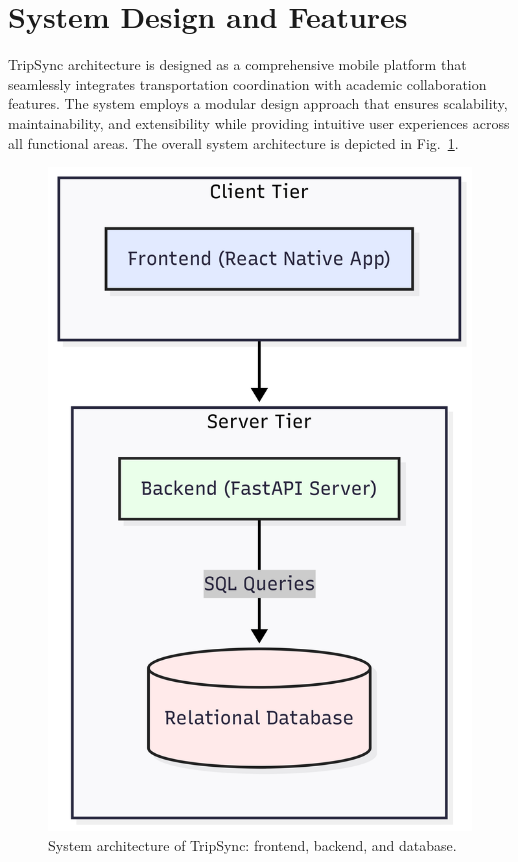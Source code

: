 \documentclass[conference]{IEEEtran}
\begin{document}
\section{System Design and Features}

TripSync architecture is designed as a comprehensive mobile platform that seamlessly integrates transportation coordination with academic collaboration features. The system employs a modular design approach that ensures scalability, maintainability, and extensibility while providing intuitive user experiences across all functional areas. The overall system architecture is depicted in Fig.~\ref{fig:system_architecture}.

\begin{figure}[!htbp]
  \centering
  \includegraphics[width=0.9\columnwidth]{system_architecture.png}
  \caption{System architecture of TripSync: frontend, backend, and database.}
  \label{fig:system_architecture}
\end{figure}
\end{document}
